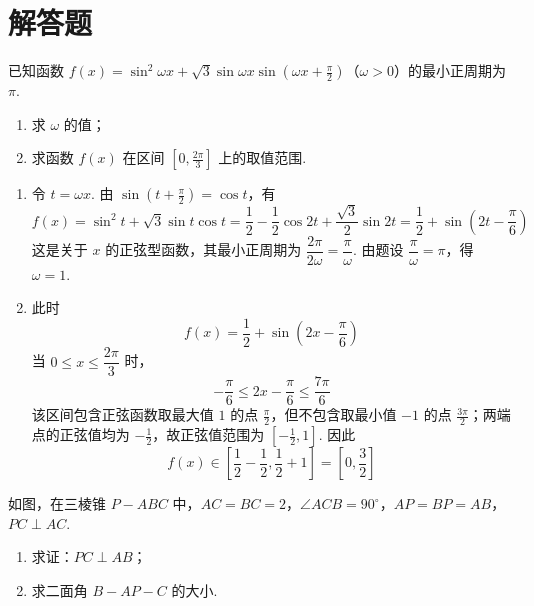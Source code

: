 \section{解答题}

\begin{problem}
已知函数 \( f(x) = \sin^2\omega x + \sqrt{3}\sin \omega x\sin \left(\omega x + \frac{\pi}{2}\right) \)（\(\omega > 0\)）的最小正周期为 \( \pi \).

\begin{enumerate}
\item 求 \(\omega\) 的值；
\item 求函数 \( f(x) \) 在区间 \(\left[0, \frac{2\pi}{3}\right]\) 上的取值范围.
\end{enumerate}
\end{problem}

\begin{solution}
\begin{enumerate}
\item 令 \(t=\omega x\). 由 \(\sin(t+\frac\pi2)=\cos t\)，有
\[
f(x)=\sin^2t+\sqrt3\sin t\cos t
 =\frac12-\frac12\cos2t+\frac{\sqrt3}{2}\sin2t
 =\frac12+\sin\left(2t-\frac\pi6\right)
\]
这是关于 \(x\) 的正弦型函数，其最小正周期为 \(\dfrac{2\pi}{2\omega}=\dfrac\pi\omega\). 由题设 \(\dfrac\pi\omega=\pi\)，得 \(\omega=1\).
\item 此时
\[
f(x)=\frac12+\sin\left(2x-\frac\pi6\right)
\]
当 \(0\leqslant x\leqslant\dfrac{2\pi}{3}\) 时，
\[
-\frac\pi6\leqslant2x-\frac\pi6\leqslant\frac{7\pi}{6}
\]
该区间包含正弦函数取最大值 \(1\) 的点 \(\frac\pi2\)，但不包含取最小值 \(-1\) 的点 \(\frac{3\pi}{2}\)；两端点的正弦值均为 \(-\frac12\)，故正弦值范围为 \([-\frac12,1]\). 因此
\[
f(x)\in\left[\frac12-\frac12,\frac12+1\right]=\left[0,\frac32\right]
\]
\end{enumerate}
\end{solution}

\begin{problem}
如图，在三棱锥 \(P - ABC\) 中，\(AC = BC = 2\)，\(\angle ACB = 90^\circ\)，\(AP = BP = AB\)，\(PC \perp AC\).

\begin{enumerate}
\item 求证：\(PC \perp AB\)；
\item 求二面角 \(B - AP - C\) 的大小.
\end{enumerate}

\end{problem}

